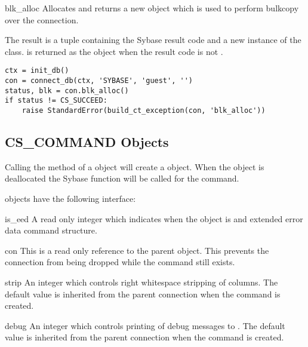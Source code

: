 \begin{methoddesc}[CS_CONNECTION]{blk_alloc}{}
Allocates and returns a new  object which is used to
perform bulkcopy over the connection.

The result is a tuple containing the Sybase result code and a new
instance of the  class.  is returned as
the  object when the result code is not
.

\begin{verbatim}
ctx = init_db()
con = connect_db(ctx, 'SYBASE', 'guest', '')
status, blk = con.blk_alloc()
if status != CS_SUCCEED:
    raise StandardError(build_ct_exception(con, 'blk_alloc'))
\end{verbatim}
\end{methoddesc}

\subsection{CS_COMMAND Objects}

Calling the  method of a 
object will create a  object.  When the
 object is deallocated the Sybase
 function will be called for the command.

 objects have the following interface:

\begin{memberdesc}[CS_COMMAND]{is_eed}
A read only integer which indicates when the  object
is and extended error data command structure.
\end{memberdesc}

\begin{memberdesc}[CS_COMMAND]{con}
This is a read only reference to the parent 
object.  This prevents the connection from being dropped while the
command still exists.
\end{memberdesc}

\begin{memberdesc}[CS_COMMAND]{strip}
An integer which controls right whitespace stripping of 
columns.  The default value is inherited from the parent connection
when the command is created.
\end{memberdesc}

\begin{memberdesc}[CS_COMMAND]{debug}
An integer which controls printing of debug messages to .
The default value is inherited from the parent connection when the
command is created.
\end{memberdesc}

